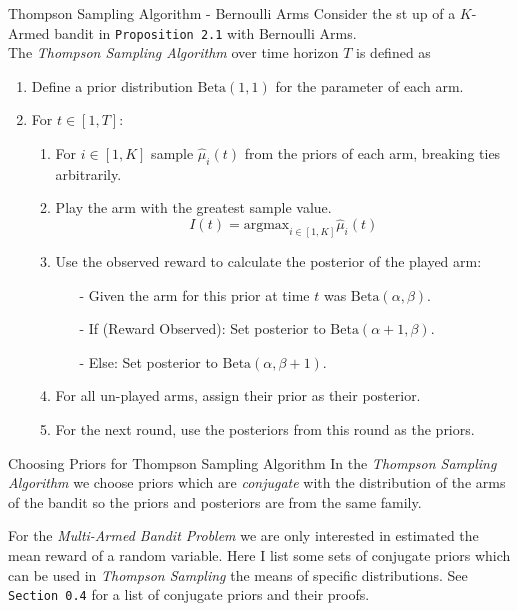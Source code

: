 \documentclass[11pt,a4paper]{article}
\begin{document}
  \begin{definition}{Thompson Sampling Algorithm - Bernoulli Arms}
    Consider the st up of a $K$-Armed bandit in \texttt{Proposition 2.1} with Bernoulli Arms.\\
    The \textit{Thompson Sampling Algorithm} over time horizon $T$ is defined as
    \begin{enumerate}
      \item Define a prior distribution $\text{Beta}(1,1)$ for the parameter of each arm.
      \item For $t\in[1,T]$:
      \begin{enumerate}
        \item For $i\in[1,K]$ sample $\hat\mu_i(t)$ from the priors of each arm, breaking ties arbitrarily.
        \item Play the arm with the greatest sample value.
        \[ I(t)=\text{argmax}_{i\in[1,K]}\hat\mu_i(t) \]
        \item Use the observed reward to calculate the posterior of the played arm:
        \begin{itemize}
          \item[-] Given the arm for this prior at time $t$ was $\text{Beta}(\alpha,\beta)$.
          \item[-] If (Reward Observed): Set posterior to $\text{Beta}(\alpha+1,\beta)$.
          \item[-] Else: Set posterior to $\text{Beta}(\alpha,\beta+1)$.
        \end{itemize}
        \item For all un-played arms, assign their prior as their posterior.
        \item For the next round, use the posteriors from this round as the priors.
      \end{enumerate}
    \end{enumerate}
  \end{definition}

  \begin{remark}{Choosing Priors for Thompson Sampling Algorithm}
    In the \textit{Thompson Sampling Algorithm} we choose priors which are \textit{conjugate} with the distribution of the arms of the bandit so the priors and posteriors are from the same family.
    \par For the \textit{Multi-Armed Bandit Problem} we are only interested in estimated the mean reward of a random variable. Here I list some sets of conjugate priors which can be used in \textit{Thompson Sampling} the means of specific distributions. See \texttt{Section 0.4} for a list of conjugate priors and their proofs.
  \end{remark}
\end{document}
